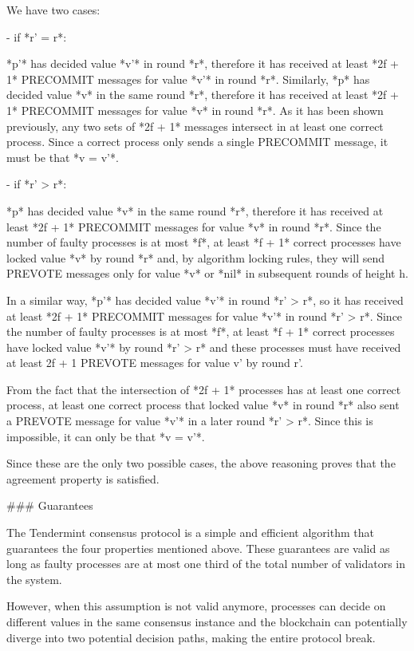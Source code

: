 \documentclass[a4paper,11pt,oneside]{report}
\begin{document}
\begin{markdown}
We have two cases:

- if *r' = r*: 

    *p'* has decided value *v'* in round *r*, therefore it has received at least *2f + 1* PRECOMMIT messages for value *v'* in round *r*. 
    Similarly, *p* has decided value *v* in the same round *r*, therefore it has received at least *2f + 1* PRECOMMIT messages for value *v* in round *r*. 
    As it has been shown previously, any two sets of *2f + 1* messages intersect in at least one correct process. Since a correct process only sends a single PRECOMMIT message, it must be that *v = v'*.  

- if *r' > r*:
        
    *p* has decided value *v* in the same round *r*, therefore it has received at least *2f + 1* PRECOMMIT messages for value *v* in round *r*.
    Since the number of faulty processes is at most *f*, at least *f + 1* correct processes have locked value *v* by round *r* and, by algorithm locking rules, they will send PREVOTE messages only for value *v* or *nil* in subsequent rounds of height h.
    
    In a similar way, *p'* has decided value *v'* in round *r' > r*, so it has received at least *2f + 1* PRECOMMIT messages for value *v'* in round *r' > r*. 
    Since the number of faulty processes is at most *f*, at least *f + 1* correct processes have locked value *v'* by round *r' > r* and these processes must have received at least 2f + 1 PREVOTE messages for value v' by round r'.
    
    From the fact that the intersection of *2f + 1* processes has at least one correct process, at least one correct process that locked value *v* in round *r* also sent a PREVOTE message for value *v'* in a later round *r' > r*. 
    Since this is impossible, it can only be that *v = v'*.

Since these are the only two possible cases, the above reasoning proves that the agreement property is satisfied.

### Guarantees 

The Tendermint consensus protocol is a simple and efficient algorithm that guarantees the four properties mentioned above. These guarantees are valid as long as faulty processes are at most one third of the total number of validators in the system.

However, when this assumption is not valid anymore, processes can decide on different values in the same consensus instance and the blockchain can potentially diverge into two potential decision paths, making the entire protocol break.


\end{markdown}
\end{document}
